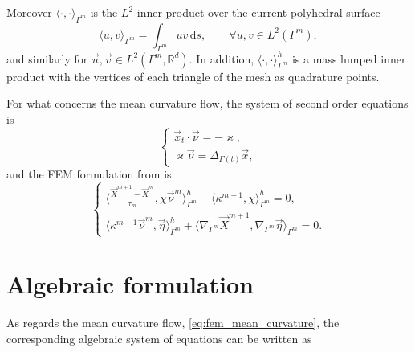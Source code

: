 Moreover $\langle\cdot,\cdot\rangle_{\Gamma^m}$ is the $L^2$ inner product over
the current polyhedral surface
\begin{equation}\label{}
 \langle u,v\rangle_{\Gamma^m} = \int_{\Gamma^m}uv\,\mathrm{d}s,\qquad\forall
  u,v\in L^2(\Gamma^m),
\end{equation}
and similarly for $\vec{u},\vec{v}\in L^2(\Gamma^m,\mathbb{R}^d)$. In addition,
$\langle \cdot,\cdot\rangle_{\Gamma^m}^h$ is a mass lumped inner product with
the vertices of each triangle of the mesh as quadrature points.

For what concerns the mean curvature flow, the system of second order equations
is
\begin{equation}\label{eq:mean_curvature_sys}
 \begin{cases}
  \vec{x}_t\cdot\vec{\nu}=-\varkappa,\\
  \varkappa\vec{\nu}=\Delta_{\Gamma(t)}\vec{x},
 \end{cases}
\end{equation}
and the FEM formulation from \cite{gflows3d} is
\begin{equation}\label{eq:fem_mean_curvature}
 \begin{cases}
  \langle \frac{\vec{X}^{m + 1} - \vec{X}^{m}}{\tau_m},
  \chi\vec{\nu}^m\rangle_{\Gamma^m}^{h} - \langle\kappa^{m+1}, \chi
  \rangle_{\Gamma^m}^{h}=0,\\
  \langle\kappa^{m+1}\vec{\nu}^m, \vec{\eta}\rangle_{\Gamma^m}^{h} +
  \langle\nabla_{\Gamma^m}\vec{X}^{m + 1}, \nabla_{\Gamma^m}\vec{\eta}
  \rangle_{\Gamma^m}=0.
 \end{cases}
\end{equation}

\section[Algebraic formulation]{Algebraic formulation}

As regards the mean curvature flow, \eqref{eq:fem_mean_curvature}, the
corresponding algebraic system of equations can be written as

